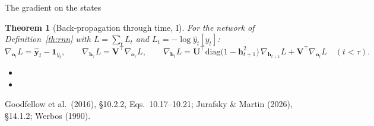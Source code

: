 \documentclass[aspectratio=169, 11pt]{beamer}
\newtheorem{thmx}[theorem]{Theorem}
\newcommand{\srcline}[1]{%
  \par\vspace{0.25em}%
  {\scriptsize\color{mcMuted}\hfill #1\par}}
\newcommand{\src}[3]{}      %
\begin{document}
\begin{frame}{The gradient on the states}
  \src{goodfellow2016}{equation}{10.17-10.21}
  \src{goodfellow2016}{section}{10.2.2}
  \src{jurafsky_slp3}{section}{14.1.2}
  \src{werbos1990}{section}{III}
  \vspace{-0.45em}
  \begin{thmx}[Back-propagation through time, I]\label{th:bptt}
    \small
    For the network of Definition~\ref{th:rnn} with $L = \sum_t L_t$ and
    $L_t = -\log \hat{y}_t[y_t]$:
    \[
      \nabla_{\mathbf{o}_t}L = \hat{\mathbf{y}}_t - \mathbf{1}_{y_t}, \qquad
      \nabla_{\mathbf{h}_\tau}L = \mathbf{V}^{\top}\nabla_{\mathbf{o}_\tau}L, \qquad
      \nabla_{\mathbf{h}_t}L = \mathbf{U}^{\top}\mathrm{diag}\big(1 - \mathbf{h}_{t+1}^2\big)\,\nabla_{\mathbf{h}_{t+1}}L
                              + \mathbf{V}^{\top}\nabla_{\mathbf{o}_t}L
      \quad (t < \tau).
    \]
  \end{thmx}
  \vspace{-0.1em}
  {\footnotesize
  \begin{itemize}\itemsep0.12em
    \item {}
    \item {}
  \end{itemize}}
  \vspace{-0.3em}
  \srcline{Goodfellow et al.\ (2016), \S10.2.2, Eqs.~10.17--10.21; Jurafsky \& Martin (2026), \S14.1.2; Werbos (1990).}
\end{frame}
\end{document}
